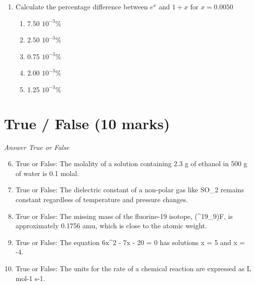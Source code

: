 \documentclass[12pt]{article}
\begin{document}
\begin{enumerate}[label=\arabic*.]
\begin{enumerate}[label=(\alph*)]
    \item no two electrons can occupy separate orbitals
    \item no two protons can have the same four quantum numbers
    \item two electrons can share the same quantum number if they are in different orbitals
    \item no two electrons can have the same four quantum numbers
    \item no two electrons can pair up if there is an empty orbital available
\end{enumerate}
\item Calculate the percentage difference between $e^x$ and $1+x$ for $x=0.0050$
\begin{enumerate}[label=(\alph*)]
    \item 7.50 $10^{-3} \%$
    \item 2.50 $10^{-3} \%$
    \item 0.75 $10^{-3} \%$
    \item 2.00 $10^{-3} \%$
    \item 1.25 $10^{-3} \%$
\end{enumerate}
\end{enumerate}

\section*{True / False (10 marks)}
\textit{Answer True or False}
\begin{enumerate}[label=\arabic*.]
\setcounter{enumi}{5}
\item True or False: The molality of a solution containing 2.3 g of ethanol in 500 g of water is 0.1 molal.
\item True or False: The dielectric constant of a non-polar gas like SO\_2 remains constant regardless of temperature and pressure changes.
\item True or False: The missing mass of the fluorine-19 isotope, (\^{}19\_9)F, is approximately 0.1756 amu, which is close to the atomic weight.
\item True or False: The equation 6x\^{}2 - 7x - 20 = 0 has solutions x = 5 and x = -4.
\item True or False: The units for the rate of a chemical reaction are expressed as L mol-1 s-1.
\end{enumerate}
\end{document}

